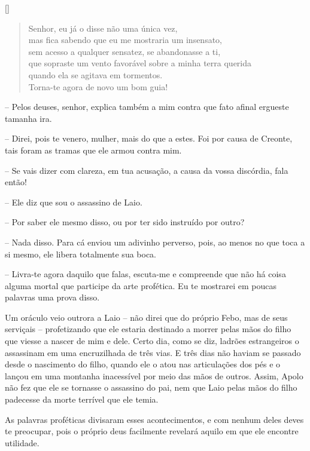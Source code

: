 \hfill [] 

\begin{verse}Senhor, eu já o disse não uma única vez, \\
mas fica sabendo que eu me mostraria um insensato,\\
sem acesso a qualquer sensatez, se abandonasse a ti,\\
que sopraste um vento favorável sobre a minha terra querida\\
quando ela se agitava em tormentos.\\
Torna-te agora de novo um bom guia!
\end{verse}

 --   Pelos deuses, senhor, explica também a mim contra que fato afinal
ergueste tamanha ira.

 --    Direi, pois te venero, mulher, mais do que a estes. Foi por causa
de Creonte, tais foram as tramas que ele armou contra mim.

 --   Se vais dizer com clareza, em tua acusação, a causa da vossa discórdia,
fala então!

 --   Ele diz que sou o assassino de Laio.

 --   Por saber ele mesmo disso, ou por ter sido instruído por outro?

 --   Nada disso. Para cá enviou um adivinho perverso, pois, ao menos no que
toca a si mesmo, ele libera totalmente sua boca.

 --   Livra-te agora daquilo que falas, escuta-me e compreende que não há
coisa  alguma mortal que participe da arte profética. Eu te
mostrarei em poucas palavras uma prova disso.

Um oráculo veio outrora a Laio -- não direi que do próprio Febo, mas de
seus serviçais -- profetizando que ele estaria destinado a morrer pelas
mãos do filho que viesse a nascer de mim e dele. Certo dia, como se diz,
ladrões estrangeiros o assassinam em uma encruzilhada de três vias. E
três dias não haviam se passado desde o nascimento do filho, quando ele
o atou nas articulações dos pés e o lançou em uma montanha 
inacessível por meio das mãos de outros. Assim, Apolo não fez que ele se
tornasse o assassino do pai, nem que Laio pelas mãos do filho padecesse
da morte terrível que ele temia.

As palavras proféticas divisaram esses acontecimentos, e com nenhum
deles deves te preocupar, pois o próprio deus facilmente revelará aquilo
em que ele encontre utilidade.

